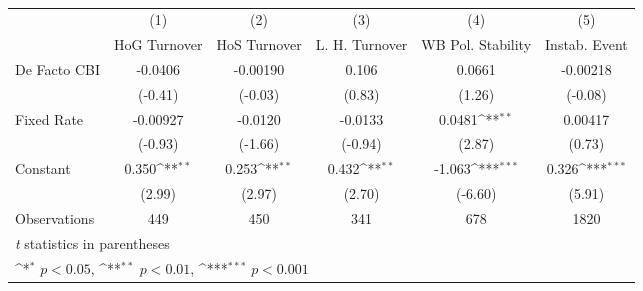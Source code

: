 \begin{table}[htbp]\centering
\def\sym#1{\ifmmode^{#1}\else\(^{#1}\)\fi}
\caption{\label{nondemocraciesFEDF}}
\begin{tabular}{l*{5}{c}}
\toprule
                                        &\multicolumn{1}{c}{(1)}&\multicolumn{1}{c}{(2)}&\multicolumn{1}{c}{(3)}&\multicolumn{1}{c}{(4)}&\multicolumn{1}{c}{(5)}\\
                                        &\multicolumn{1}{c}{HoG Turnover}&\multicolumn{1}{c}{HoS Turnover}&\multicolumn{1}{c}{L. H. Turnover}&\multicolumn{1}{c}{WB Pol. Stability}&\multicolumn{1}{c}{Instab. Event}\\
\midrule
De Facto CBI                            &  -0.0406         & -0.00190         &    0.106         &   0.0661         & -0.00218         \\
                                        &  (-0.41)         &  (-0.03)         &   (0.83)         &   (1.26)         &  (-0.08)         \\
\addlinespace
Fixed Rate                              & -0.00927         &  -0.0120         &  -0.0133         &   0.0481\sym{**} &  0.00417         \\
                                        &  (-0.93)         &  (-1.66)         &  (-0.94)         &   (2.87)         &   (0.73)         \\
\addlinespace
Constant                                &    0.350\sym{**} &    0.253\sym{**} &    0.432\sym{**} &   -1.063\sym{***}&    0.326\sym{***}\\
                                        &   (2.99)         &   (2.97)         &   (2.70)         &  (-6.60)         &   (5.91)         \\
\midrule
Observations                            &      449         &      450         &      341         &      678         &     1820         \\
\bottomrule
\multicolumn{6}{l}{\footnotesize \textit{t} statistics in parentheses}\\
\multicolumn{6}{l}{\footnotesize \sym{*} \(p<0.05\), \sym{**} \(p<0.01\), \sym{***} \(p<0.001\)}\\
\end{tabular}
\end{table}
